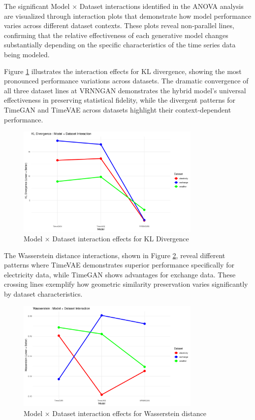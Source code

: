 \documentclass{article}
\begin{document}
The significant Model × Dataset interactions identified in the ANOVA analysis are visualized through interaction plots that demonstrate how model performance varies across different dataset contexts. These plots reveal non-parallel lines, confirming that the relative effectiveness of each generative model changes substantially depending on the specific characteristics of the time series data being modeled.

Figure \ref{fig:kl_interaction} illustrates the interaction effects for KL divergence, showing the most pronounced performance variations across datasets. The dramatic convergence of all three dataset lines at VRNNGAN demonstrates the hybrid model's universal effectiveness in preserving statistical fidelity, while the divergent patterns for TimeGAN and TimeVAE across datasets highlight their context-dependent performance.

\begin{figure}[H]
\centering
\includegraphics[width=0.8\textwidth]{assets/interaction_kl.png}
\caption{Model × Dataset interaction effects for KL Divergence}
\label{fig:kl_interaction}
\end{figure}

The Wasserstein distance interactions, shown in Figure \ref{fig:wasserstein_interaction}, reveal different patterns where TimeVAE demonstrates superior performance specifically for electricity data, while TimeGAN shows advantages for exchange data. These crossing lines exemplify how geometric similarity preservation varies significantly by dataset characteristics.

\begin{figure}[H]
\centering
\includegraphics[width=0.8\textwidth]{assets/interaction_wasserstein.png}
\caption{Model × Dataset interaction effects for Wasserstein distance}
\label{fig:wasserstein_interaction}
\end{figure}
\end{document}
